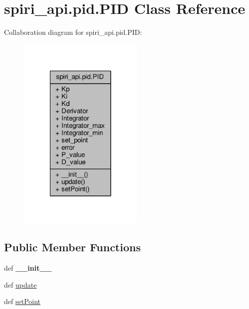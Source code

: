 \hypertarget{classspiri__api_1_1pid_1_1_p_i_d}{\section{spiri\-\_\-api.\-pid.\-P\-I\-D Class Reference}
\label{classspiri__api_1_1pid_1_1_p_i_d}
}


Collaboration diagram for spiri\-\_\-api.\-pid.\-P\-I\-D\-:
\nopagebreak
\begin{figure}[H]
\begin{center}
\leavevmode
\includegraphics[width=170pt]{classspiri__api_1_1pid_1_1_p_i_d__coll__graph}
\end{center}
\end{figure}
\subsection*{Public Member Functions}
\begin{DoxyCompactItemize}
\item 
\hypertarget{classspiri__api_1_1pid_1_1_p_i_d_a1caafcce2de3920b8e3d7a3c819f30a7}{def {\bfseries \-\_\-\-\_\-init\-\_\-\-\_\-}}\label{classspiri__api_1_1pid_1_1_p_i_d_a1caafcce2de3920b8e3d7a3c819f30a7}

\item 
def \hyperlink{classspiri__api_1_1pid_1_1_p_i_d_a7e0273463b18d2f0ddef7f91c8457ea9}{update}
\item 
def \hyperlink{classspiri__api_1_1pid_1_1_p_i_d_ae1ae6a13b63865567c271c0eb2118fa2}{set\-Point}
\end{DoxyCompactItemize}
